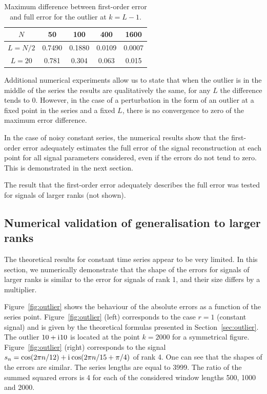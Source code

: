 \documentclass[engproc, submit, article,pdftex,moreauthors]{Definitions/mdpi}
\newcommand{\iu}{\mathrm{i}\mkern1mu}
\begin{document}
\begin{table}[H]
	\begin{center}
		\caption{Maximum difference between first-order error and full error for the outlier at $k=L-1$.}
		\label{tab:const_outl}
		\begin{tabular}{|c|c|c|c|c|}
			\hline
			$N$	& 50 & 100 & 400 & 1600 \\
			\hline
			$L = N / 2$ & 0.7490  & 0.1880  & 0.0109 & 0.0007 \\
			\hline
			$L = 20$ & 0.781  & 0.304  & 0.063 & 0.015 \\
			\hline
		\end{tabular}
	\end{center}
\end{table}

Additional numerical experiments allow us to state that when the outlier is in the middle of the series the results are qualitatively the same, for any $L$ the difference tends to $0$.
However, in the case of a perturbation in the form of an outlier at a fixed point in the series and a fixed $L$, there is no convergence to zero of the maximum error difference.

In the case of noisy constant series, the numerical results show that the first-order error adequately estimates the full error of the signal reconstruction at each point for all signal parameters considered, even if the errors do not tend to zero.
This is demonstrated in the next section.

The result that the first-order error adequately describes the full error was tested for signals of larger ranks (not shown).

\subsection{Numerical validation of generalisation to larger ranks}
The theoretical results for constant time series appear to be very limited. In this section, we numerically demonstrate that the shape of the errors for signals of larger ranks is similar to the error for signals of rank 1, and their size differs by a multiplier.

Figure~\ref{fig:outlier} shows the behaviour of the absolute errors as a function of the series point. Figure~\ref{fig:outlier} (left) corresponds to the case $r=1$ (constant signal) and is given by the theoretical formulas presented in Section~\ref{sec:outlier}. The outlier $10+\iu 10$ is located at the point $k=2000$ for a symmetrical figure.
Figure~\ref{fig:outlier} (right) corresponds to the signal $s_n = \cos(2\pi n/12) + \iu \cos(2\pi n/15 + \pi/4)$ of rank 4. One can see that the shapes of the errors are similar. The series lengths are equal to 3999. The ratio of the summed squared errors is 4 for each of the considered window lengths 500, 1000 and 2000.
\end{document}
